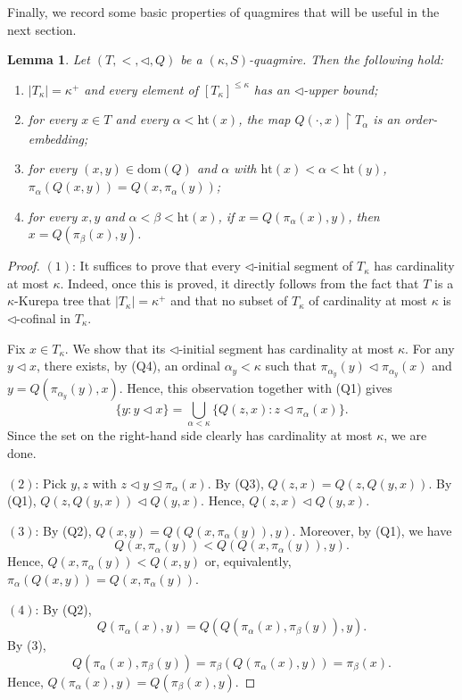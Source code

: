 \documentclass[]{amsart}
\newtheorem{lemma}[theorem]{Lemma}
\theoremstyle{definition}
\theoremstyle{remark}
\begin{document}
Finally, we record some basic properties of quagmires that will be useful in the next section.

\begin{lemma}\label{lemma:basicquag}
Let $(T, <, \lhd, Q)$ be a $(\kappa, S)$-quagmire. Then the following hold:
\begin{enumerate}[label={\upshape (\arabic*)}]
\item $|T_\kappa| = \kappa^+$ and every element of $[T_{\kappa}]^{\le \kappa}$ has an $\lhd$-upper bound;
\item for every $x \in T$ and every $\alpha < \mathrm{ht}(x)$, the map $Q(\cdot, x) \upharpoonright T_\alpha$ is an order-embedding;
\item for every $(x, y) \in \mathrm{dom}(Q)$ and $\alpha$ with $\mathrm{ht}(x) < \alpha < \mathrm{ht}(y)$, $\pi_\alpha(Q(x, y)) = Q(x, \pi_\alpha(y))$;
\item for every $x, y$ and $\alpha < \beta < \mathrm{ht}(x)$, if $x = Q(\pi_\alpha(x), y)$, then $x = Q(\pi_\beta(x), y)$.
\end{enumerate}
\end{lemma}
\begin{proof}
$(1)$: It suffices to prove that every $\lhd$-initial segment of $T_\kappa$ has cardinality at most $\kappa$. Indeed, once this is proved, it directly follows from the fact that $T$ is a $\kappa$-Kurepa tree that $|T_\kappa| = \kappa^+$ and that no subset of $T_\kappa$ of cardinality at most $\kappa$ is $\lhd$-cofinal in $T_\kappa$.

Fix $x\in T_\kappa$. We show that its $\lhd$-initial segment has cardinality at most $\kappa$. For any $y \lhd x$, there exists, by (Q4), an ordinal $\alpha_y < \kappa$ such that $\pi_{\alpha_y}(y) \lhd \pi_{\alpha_y}(x)$ and $y = Q(\pi_{\alpha_y}(y), x)$. Hence, this observation together with (Q1) gives
\[
\{y : y \lhd x\} = \bigcup_{\alpha < \kappa} \{Q(z, x) : z \lhd \pi_\alpha(x)\}.
\]
Since the set on the right-hand side clearly has cardinality at most $\kappa$, we are done.

$(2)$: Pick $y,z$ with $z \lhd y \trianglelefteq \pi_\alpha(x)$. By (Q3), $Q(z, x) = Q(z, Q(y, x))$. By (Q1), $Q(z, Q(y, x)) \lhd Q(y, x)$. Hence, $Q(z, x) \lhd Q(y, x)$.

$(3)$: By (Q2), $Q(x, y) = Q(Q(x, \pi_\alpha(y)), y)$. Moreover, by (Q1), we have \[
Q(x, \pi_\alpha(y)) < Q(Q(x, \pi_\alpha(y)), y).
\]
Hence, $Q(x, \pi_\alpha(y)) < Q(x, y)$ or, equivalently, $\pi_\alpha(Q(x, y)) = Q(x, \pi_\alpha(y))$.

$(4)$: By (Q2), 
\[
Q(\pi_\alpha(x), y) = Q(Q(\pi_\alpha(x), \pi_\beta(y)), y).
\]
 By (3), 
\[
Q(\pi_\alpha(x), \pi_\beta(y)) = \pi_\beta(Q(\pi_\alpha(x), y)) = \pi_\beta(x).
\]
 Hence, $Q(\pi_\alpha(x), y) = Q(\pi_\beta(x), y)$.
\end{proof}
\end{document}
